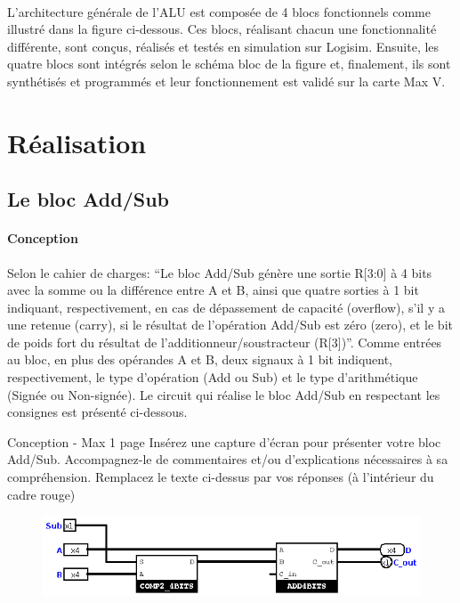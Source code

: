 \documentclass[a4paper]{article}
\begin{document}
\paragraph{}
L’architecture générale de l’ALU est composée de 4 blocs fonctionnels comme illustré dans la figure ci-dessous. Ces blocs, réalisant chacun une fonctionnalité différente, sont conçus, réalisés et testés en simulation sur Logisim. Ensuite, les quatre blocs sont intégrés selon le schéma bloc de la figure et, finalement, ils sont synthétisés et programmés et leur fonctionnement est validé sur la carte Max V. 

\section{Réalisation}
\subsection{Le bloc Add/Sub}
\label{add_Sub}

\paragraph{Conception}
Selon le cahier de charges: “Le bloc Add/Sub génère une sortie R[3:0] à 4 bits avec la somme ou la différence entre A et B, ainsi que quatre sorties à 1 bit indiquant, respectivement, en cas de dépassement de capacité (overflow), s’il y a une retenue (carry), si le résultat de l’opération Add/Sub est zéro (zero), et le bit de poids fort du résultat de l’additionneur/soustracteur (R[3])”. Comme entrées au bloc, en plus des opérandes A et B, deux signaux à 1 bit indiquent, respectivement, le type d’opération (Add ou Sub) et le type d’arithmétique (Signée ou Non-signée). Le circuit qui réalise le bloc Add/Sub en respectant les consignes est présenté ci-dessous. 


\begin{tcolorbox}[colframe=Monokaimagenta,colback=white]
Conception - Max 1 page 
Insérez une capture d’écran pour présenter votre bloc Add/Sub.
Accompagnez-le de commentaires et/ou d’explications nécessaires à sa compréhension.
Remplacez le texte ci-dessus par vos réponses (à l’intérieur du cadre rouge)


\begin{figure}[H]
    \centering
    \includegraphics[width=\textwidth]{src/ADDSUB_4BITS.png}
\end{figure}
    
\end{tcolorbox}
\end{document}
